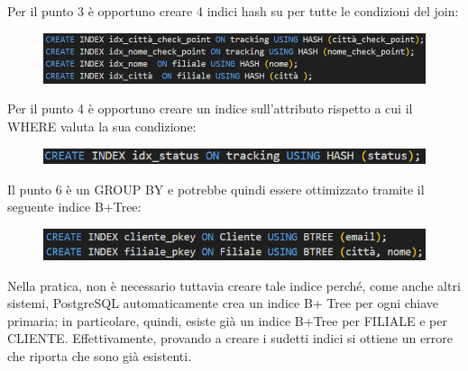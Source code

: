 \noindent Per il punto 3 è opportuno creare 4 indici hash su per tutte le condizioni del join:

\begin{figure}[H]
\centering
\includegraphics[width=1 \textwidth]{Resources/INDEX3.png}
\label{ML}
\end{figure}

\noindent Per il punto 4 è opportuno creare un indice sull'attributo rispetto a cui il WHERE valuta la sua condizione:

\begin{figure}[H]
\centering
\includegraphics[width=1 \textwidth]{Resources/INDEX4.png}
\label{ML}
\end{figure}

\noindent Il punto 6 è un GROUP BY e potrebbe quindi essere ottimizzato tramite il seguente indice B+Tree:

\begin{figure}[H]
\centering
\includegraphics[width=1 \textwidth]{Resources/INDEX5.png}
\label{ML}
\end{figure}  

\noindent Nella pratica, non è necessario tuttavia creare tale indice perché, come anche altri
sistemi, PostgreSQL automaticamente crea un indice B+ Tree per ogni chiave primaria; in particolare, quindi, esiste già un indice B+Tree per FILIALE e per CLIENTE.
\noindent Effettivamente, provando a creare i sudetti indici si ottiene un errore che riporta che sono già esistenti.
